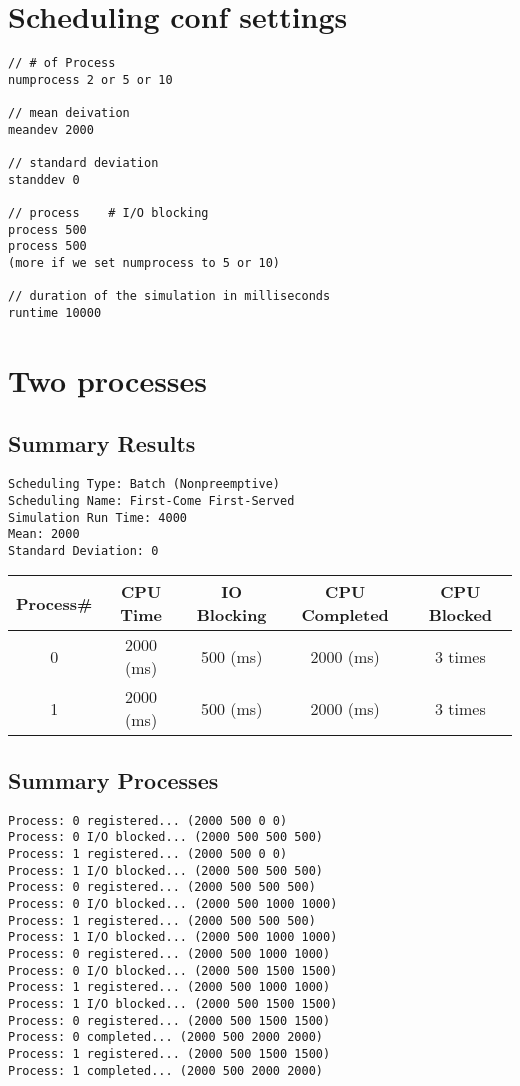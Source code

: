 \documentclass{report}
\begin{document}
\section{Scheduling conf settings}
\begin{lstlisting}
// # of Process	
numprocess 2 or 5 or 10

// mean deivation
meandev 2000

// standard deviation
standdev 0

// process    # I/O blocking
process 500
process 500
(more if we set numprocess to 5 or 10)

// duration of the simulation in milliseconds
runtime 10000

\end{lstlisting}

\section{Two processes}
\subsection{Summary Results}


\begin{lstlisting}
Scheduling Type: Batch (Nonpreemptive)
Scheduling Name: First-Come First-Served
Simulation Run Time: 4000
Mean: 2000
Standard Deviation: 0
\end{lstlisting}

\begin{center}
\begin{tabular}{| c | c | c | c | c |}
\hline
Process\# &	CPU Time &	IO Blocking & CPU Completed & CPU Blocked \\
\hline
0&		2000 (ms)&	500 (ms)&	2000 (ms)&	3 times \\
\hline
1&		2000 (ms)&	500 (ms)&	2000 (ms)&	3 times \\
\hline
\end{tabular}
\end{center}

\subsection{Summary Processes}
\begin{lstlisting}
Process: 0 registered... (2000 500 0 0)
Process: 0 I/O blocked... (2000 500 500 500)
Process: 1 registered... (2000 500 0 0)
Process: 1 I/O blocked... (2000 500 500 500)
Process: 0 registered... (2000 500 500 500)
Process: 0 I/O blocked... (2000 500 1000 1000)
Process: 1 registered... (2000 500 500 500)
Process: 1 I/O blocked... (2000 500 1000 1000)
Process: 0 registered... (2000 500 1000 1000)
Process: 0 I/O blocked... (2000 500 1500 1500)
Process: 1 registered... (2000 500 1000 1000)
Process: 1 I/O blocked... (2000 500 1500 1500)
Process: 0 registered... (2000 500 1500 1500)
Process: 0 completed... (2000 500 2000 2000)
Process: 1 registered... (2000 500 1500 1500)
Process: 1 completed... (2000 500 2000 2000)
\end{lstlisting}
\end{document}
